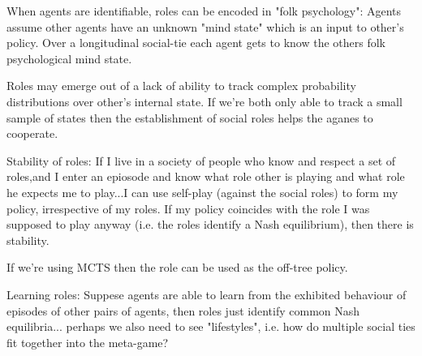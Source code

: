 \documentclass[a4paper]{article}
\begin{document}
When agents are identifiable, roles can be encoded in "folk psychology": Agents assume other agents have an unknown "mind state" which is an input to other's policy. Over a longitudinal social-tie each agent gets to know the others folk psychological mind state.

Roles may emerge out of a lack of ability to track complex probability distributions over other's internal state. If we're both only able to track a small sample of states then the establishment of social roles helps the aganes to cooperate.


Stability of roles: If I live in a society of people who know and respect a set of roles,and I enter an epiosode and know what role other is playing and what role he expects me to play...I can use self-play (against the social roles) to form my policy, irrespective of my roles. If my policy coincides with the role I was supposed to play anyway (i.e. the roles identify a Nash equilibrium), then there is stability.

If we're using MCTS then the role can be used as the off-tree policy.

Learning roles: Suppese agents are able to learn from the exhibited behaviour of episodes of other pairs of agents, then roles just identify common Nash equilibria... perhaps we also need to see "lifestyles", i.e. how do multiple social ties fit together into the meta-game?
 

\end{document}
